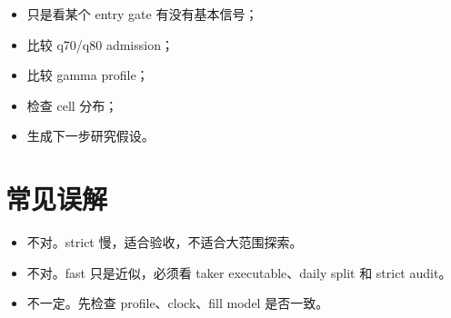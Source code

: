 \begin{itemize}[leftmargin=2em]
  \item 只是看某个 entry gate 有没有基本信号；
  \item 比较 q70/q80 admission；
  \item 比较 gamma profile；
  \item 检查 cell 分布；
  \item 生成下一步研究假设。
\end{itemize}

\section{常见误解}

\begin{itemize}[leftmargin=2em]
  \item {}不对。strict 慢，适合验收，不适合大范围探索。
  \item {}不对。fast 只是近似，必须看 taker executable、daily split 和 strict audit。
  \item {}不一定。先检查 profile、clock、fill model 是否一致。
\end{itemize}


